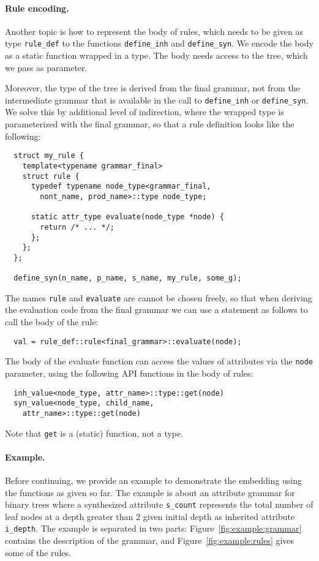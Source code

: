 \documentclass{llncs}
\begin{document}
  \paragraph{Rule encoding.}
  Another topic is how to represent the body of rules, which
  needs to be given as type \lstinline$rule_def$ to the
  functions \lstinline$define_inh$ and \lstinline$define_syn$.
  We encode the body as a static function wrapped in a type.
  The body needs access to the tree, which we pass as parameter.

  Moreover, the type of the tree is derived from the final
  grammar, not from the intermediate grammar that is available
  in the call to \lstinline$define_inh$ or \lstinline$define_syn$.
  We solve this by additional level of indirection, where the
  wrapped type is parameterized with the final grammar, so that
  a rule definition looks like the following:
  \begin{lstlisting}
  struct my_rule {
    template<typename grammar_final>
    struct rule {
      typedef typename node_type<grammar_final,
        nont_name, prod_name>::type node_type;

      static attr_type evaluate(node_type *node) {
        return /* ... */;
      };
    };
  };

  define_syn(n_name, p_name, s_name, my_rule, some_g);
  \end{lstlisting}
  The names \lstinline$rule$ and \lstinline$evaluate$ are
  cannot be chosen freely, so that when deriving the
  evaluation code from the final grammar
  we can use a statement as follows to call the
  body of the rule:
  \begin{lstlisting}
  val = rule_def::rule<final_grammar>::evaluate(node);
  \end{lstlisting}

  The body of the evaluate function can access the
  values of attributes via the \lstinline$node$
  parameter, using the following API functions
  in the body of rules:
  \begin{lstlisting}
  inh_value<node_type, attr_name>::type::get(node)
  syn_value<node_type, child_name,
    attr_name>::type::get(node)
  \end{lstlisting}
  Note that \lstinline$get$ is a (static) function,
  not a type.

  \paragraph{Example.}
  Before continuing, we provide an example to demonstrate
  the embedding using the functions as given so far.
  The example is about an attribute grammar for binary
  trees where a synthesized attribute \lstinline$s_count$
  represents the total number of leaf nodes at a depth greater
  than 2 given initial depth as inherited attribute \lstinline$i_depth$.
  The example is separated in two parts: Figure~\ref{fig:example:grammar}
  contains the description of the grammar, and
  Figure~\ref{fig:example:rules} gives some of
  the rules.
\end{document}
